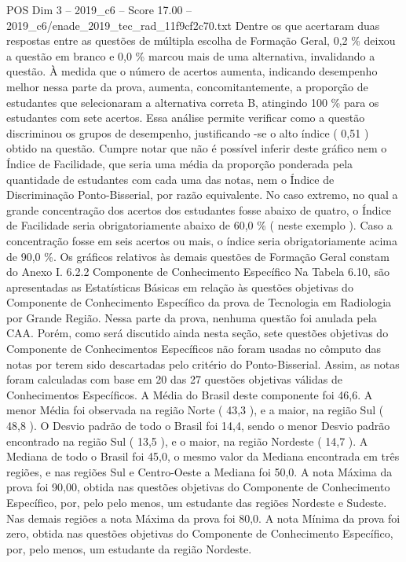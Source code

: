 \begin{textsample}{POS Dim 3 – 2019\_c6 – Score 17.00 – 2019\_c6/enade\_2019\_tec\_rad\_11f9cf2c70.txt}
Dentre os que acertaram duas respostas entre as questões de múltipla escolha de Formação Geral, 0,2 \% deixou a questão em branco e 0,0 \% marcou mais de uma alternativa, invalidando a questão.
À medida que o número de acertos aumenta, indicando desempenho melhor nessa parte da prova, aumenta, concomitantemente, a proporção de estudantes que selecionaram a alternativa correta B, atingindo 100 \% para os estudantes com sete acertos.
Essa análise permite verificar como a questão discriminou os grupos de desempenho, justificando -se o alto índice ( 0,51 ) obtido na questão.
Cumpre notar que não é possível inferir deste gráfico nem o Índice de Facilidade, que seria uma média da proporção ponderada pela quantidade de estudantes com cada uma das notas, nem o Índice de Discriminação Ponto-Bisserial, por razão equivalente.
No caso extremo, no qual a grande concentração dos acertos dos estudantes fosse abaixo de quatro, o Índice de Facilidade seria obrigatoriamente abaixo de 60,0 \% ( neste exemplo ).
Caso a concentração fosse em seis acertos ou mais, o índice seria obrigatoriamente acima de 90,0 \%.
Os gráficos relativos às demais questões de Formação Geral constam do Anexo I. 6.2.2 Componente de Conhecimento Específico Na Tabela 6.10, são apresentadas as Estatísticas Básicas em relação às questões objetivas do Componente de Conhecimento Específico da prova de Tecnologia em Radiologia por Grande Região.
Nessa parte da prova, nenhuma questão foi anulada pela CAA.
Porém, como será discutido ainda nesta seção, sete questões objetivas do Componente de Conhecimentos Específicos não foram usadas no cômputo das notas por terem sido descartadas pelo critério do Ponto-Bisserial.
Assim, as notas foram calculadas com base em 20 das 27 questões objetivas válidas de Conhecimentos Específicos.
A Média do Brasil deste componente foi 46,6.
A menor Média foi observada na região Norte ( 43,3 ), e a maior, na região Sul ( 48,8 ).
O Desvio padrão de todo o Brasil foi 14,4, sendo o menor Desvio padrão encontrado na região Sul ( 13,5 ), e o maior, na região Nordeste ( 14,7 ).
A Mediana de todo o Brasil foi 45,0, o mesmo valor da Mediana encontrada em três regiões, e nas regiões Sul e Centro-Oeste a Mediana foi 50,0.
A nota Máxima da prova foi 90,00, obtida nas questões objetivas do Componente de Conhecimento Específico, por, pelo pelo menos, um estudante das regiões Nordeste e Sudeste.
Nas demais regiões a nota Máxima da prova foi 80,0.
A nota Mínima da prova foi zero, obtida nas questões objetivas do Componente de Conhecimento Específico, por, pelo menos, um estudante da região Nordeste.

\end{textsample}
